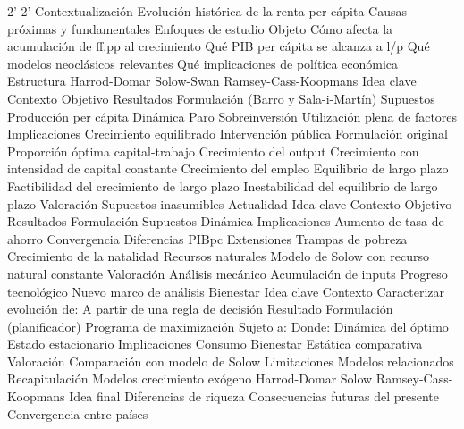 \documentclass{nuevotema}
\begin{document}
\begin{esquema}[enumerate]
	\1[]  2'-2'
		\2 Contextualización
			\3 Evolución histórica de la renta per cápita
			\3 Causas próximas y fundamentales
			\3 Enfoques de estudio
		\2 Objeto
			\3 Cómo afecta la acumulación de ff.pp al crecimiento
			\3 Qué PIB per cápita se alcanza a l/p
			\3 Qué modelos neoclásicos relevantes
			\3 Qué implicaciones de política económica
		\2 Estructura
			\3 Harrod-Domar
			\3 Solow-Swan
			\3 Ramsey-Cass-Koopmans
	\1 
		\2 Idea clave
			\3 Contexto
			\3 Objetivo
			\3 Resultados
		\2 Formulación (Barro y Sala-i-Martín)
			\3 Supuestos
			\3 Producción per cápita
			\3 Dinámica
			\3 Paro
			\3 Sobreinversión
			\3 Utilización plena de factores
		\2 Implicaciones
			\3 Crecimiento equilibrado
			\3 Intervención pública
		\2 Formulación original
			\3 Proporción óptima capital-trabajo
			\3 Crecimiento del output
			\3 Crecimiento con intensidad de capital constante
			\3 Crecimiento del empleo
			\3 Equilibrio de largo plazo
			\3 Factibilidad del crecimiento de largo plazo
			\3 Inestabilidad del equilibrio de largo plazo
		\2 Valoración
			\3 Supuestos inasumibles
			\3 Actualidad
	\1 
		\2 Idea clave
			\3 Contexto
			\3 Objetivo
			\3 Resultados
		\2 Formulación
			\3 Supuestos
			\3 Dinámica
		\2 Implicaciones
			\3 Aumento de tasa de ahorro
			\3 Convergencia
			\3 Diferencias PIBpc
		\2 Extensiones
			\3 Trampas de pobreza
			\3 Crecimiento de la natalidad
			\3 Recursos naturales
			\3 Modelo de Solow con recurso natural constante
		\2 Valoración
			\3 Análisis mecánico
			\3 Acumulación de inputs
			\3 Progreso tecnológico
			\3 Nuevo marco de análisis
			\3 Bienestar
	\1 
		\2 Idea clave
			\3 Contexto
			\3 Caracterizar evolución de:
			\3 A partir de una regla de decisión
			\3 Resultado
		\2 Formulación (planificador)
			\3 Programa de maximización
			\3 Sujeto a:
			\3 Donde:
			\3 Dinámica del óptimo
			\3 Estado estacionario
		\2 Implicaciones
			\3 Consumo
			\3 Bienestar
			\3 Estática comparativa
		\2 Valoración
			\3 Comparación con modelo de Solow
			\3 Limitaciones
			\3 Modelos relacionados
	\1[] 
		\2 Recapitulación
			\3 Modelos crecimiento exógeno
			\3 Harrod-Domar
			\3 Solow
			\3 Ramsey-Cass-Koopmans
		\2 Idea final
			\3 Diferencias de riqueza
			\3 Consecuencias futuras del presente
			\3 Convergencia entre países

\end{esquema}
\end{document}
